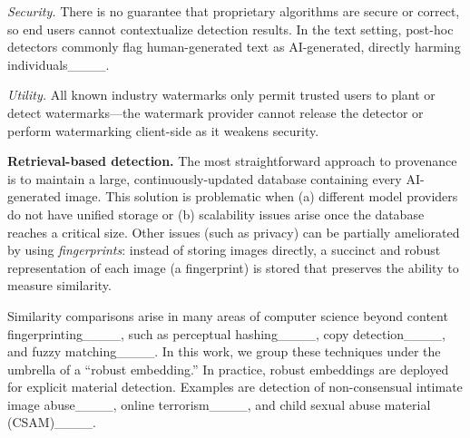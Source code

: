  
\textit{Security.} 
There is no guarantee that proprietary algorithms are secure or correct, so end users cannot contextualize detection results.
In the text setting, post-hoc detectors commonly flag human-generated text as AI-generated, directly harming individuals____.

\textit{Utility.} All known industry watermarks only permit trusted users to plant or detect watermarks---the watermark provider cannot release the detector or perform watermarking client-side as it weakens security.

\textbf{Retrieval-based detection.} 
The most straightforward approach to provenance is to maintain a large, continuously-updated database containing every AI-generated image.
This solution is problematic when (a) different model providers do not have unified storage or (b) scalability issues arise once the database reaches a critical size.
Other issues (such as privacy) can be partially ameliorated by using \textit{fingerprints}: instead of storing images directly, a succinct and robust representation of each image (a fingerprint) is stored that preserves the ability to measure similarity.

Similarity comparisons arise in many areas of computer science beyond content fingerprinting____, such as perceptual hashing____, copy detection____, and fuzzy matching____.
In this work, we group these techniques under the umbrella of a ``robust embedding.''
In practice, robust embeddings are deployed for explicit material detection.
Examples are detection of non-consensual intimate image abuse____, online terrorism____, and child sexual abuse material (CSAM)____.